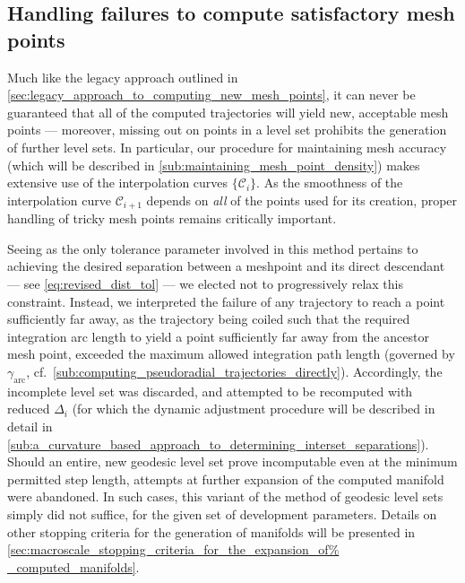\subsection{Handling failures to compute satisfactory mesh points}
\label{sub:handling_failures_to_compute_satisfactory_mesh_points_revised}

Much like the legacy approach outlined in
\cref{sec:legacy_approach_to_computing_new_mesh_points}, it can never be
guaranteed that all of the computed trajectories will yield new, acceptable
mesh points --- moreover, missing out on points in a level set prohibits
the generation of further level sets. In particular, our procedure for
maintaining mesh accuracy (which will be described in
\cref{sub:maintaining_mesh_point_density}) makes extensive use of the
interpolation curves $\{\mathcal{C}_{i}\}$. As the smoothness of the
interpolation curve $\mathcal{C}_{i+1}$ depends on \emph{all} of the points
used for its creation, proper handling of tricky mesh points remains critically
important.

Seeing as the only tolerance parameter involved in this method pertains to
achieving the desired separation between a meshpoint and its direct descendant
--- see \cref{eq:revised_dist_tol} --- we elected not to progressively relax
this constraint. Instead, we interpreted the failure of any trajectory to reach
a point sufficiently far away, as the trajectory being coiled such that the
required integration arc length to yield a point sufficiently far away from
the ancestor mesh point, exceeded the maximum allowed integration path
length (governed by $\gamma_{\text{arc}}$, cf.\
\cref{sub:computing_pseudoradial_trajectories_directly}). Accordingly, the
incomplete level set was discarded, and attempted to be recomputed with reduced
$\Delta_{i}$ (for which the dynamic adjustment procedure will be described in
detail in
\cref{sub:a_curvature_based_approach_to_determining_interset_separations}).
Should an entire, new geodesic level set prove incomputable even at the
minimum permitted step length, attempts at further expansion of the computed
manifold were abandoned. In such cases, this variant of the method of geodesic
level sets simply did not suffice, for the given set of development parameters.
Details on other stopping criteria for the generation of manifolds will be
presented in \cref{sec:macroscale_stopping_criteria_for_the_expansion_of%
_computed_manifolds}.

